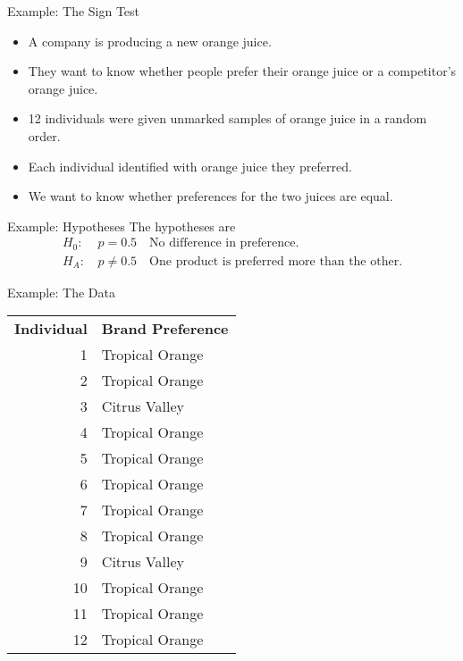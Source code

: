 \begin{frame}{Example: The Sign Test}
    \begin{itemize}
        \item A company is producing a new orange juice. 
        \item They want to know whether people prefer their orange juice or a competitor's orange juice.
        \item 12 individuals were given unmarked samples of orange juice in a random order.
        \item Each individual identified with orange juice they preferred. 
        \item We want to know whether preferences for the two juices are equal.
    \end{itemize}
\end{frame}

\begin{frame}{Example: Hypotheses}
    The hypotheses are
    \begin{align*}
        H_0\text{: }& p=0.5 \quad \text{No difference in preference.} \\
        H_A\text{: }& p\ne0.5 \quad \text{One product is preferred more than the other.} 
    \end{align*}
\end{frame}

\begin{frame}{Example: The Data}
    \centering
    \begin{tabular}{rl}
        \textbf{Individual} & \textbf{Brand Preference} \\
        1 & Tropical Orange \\ 
        2 & Tropical Orange \\ 
        3 & Citrus Valley \\ 
        4 & Tropical Orange \\ 
        5 & Tropical Orange \\ 
        6 & Tropical Orange \\ 
        7 & Tropical Orange \\ 
        8 & Tropical Orange \\ 
        9 & Citrus Valley \\ 
        10 & Tropical Orange \\ 
        11 & Tropical Orange \\ 
        12 & Tropical Orange \\ 
    \end{tabular}
\end{frame}

